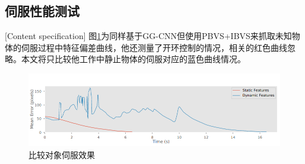 \documentclass[fontset=fandol,type=bachelor,campus=harbin,bsmainpagenumberline=true]{hithesisbook}
\begin{document}
\subsection{伺服性能测试}[Content specification]
图\ref{比较对象伺服效果}为同样基于GG-CNN但使用PBVS+IBVS来抓取未知物体的伺服过程中特征偏差曲线，他还测量了开环控制的情况，相关的红色曲线忽略。本文将只比较他工作中静止物体的伺服对应的蓝色曲线情况。
\begin{figure}[h]
	\centering
	\includegraphics[width=1.0\textwidth]{chapter6/对比工作伺服效果}
	\caption{比较对象伺服效果}
	\label{比较对象伺服效果}
\end{figure}
\end{document}
